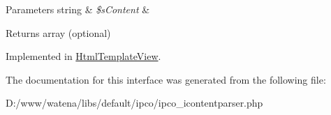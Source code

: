 \begin{DoxyParams}[1]{Parameters}
string & {\em \$s\-Content} & \\
\hline
\end{DoxyParams}
\begin{DoxyReturn}{Returns}
array (optional) 
\end{DoxyReturn}


Implemented in \hyperlink{class_html_template_view_afac9d3c71f0beefc5a0013d5f58f106f}{Html\-Template\-View}.



The documentation for this interface was generated from the following file\-:\begin{DoxyCompactItemize}
\item 
D\-:/www/watena/libs/default/ipco/ipco\-\_\-icontentparser.\-php\end{DoxyCompactItemize}
